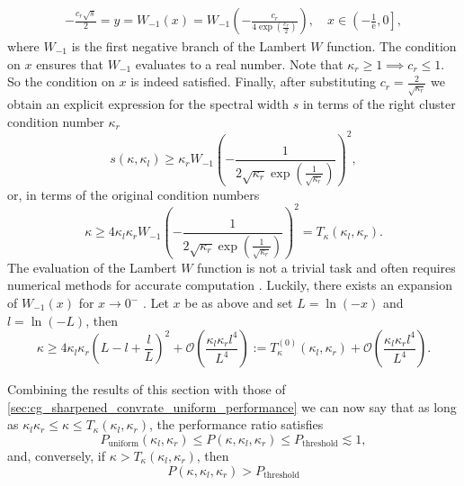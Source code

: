 \begin{align*}
    -\frac{c_r\sqrt{s}}{2} = y = W_{-1}(x) = W_{-1}\left(-\frac{c_r}{4\exp\left(\frac{c_r}{2}\right)}\right), \quad x \in \left(-\frac{1}{\mathrm{e}}, 0 \right],
\end{align*}
where $W_{-1}$ is the first negative branch of the Lambert $W$ function. The condition on $x$ ensures that $W_{-1}$ evaluates to a real number. Note that $\kappa_r\geq1 \implies c_r \leq 1$. So the condition on $x$ is indeed satisfied. Finally, after substituting $c_r = \frac{2}{\sqrt{\kappa_r}}$ we obtain an explicit expression for the spectral width $s$ in terms of the right cluster condition number $\kappa_r$
\[
    s(\kappa, \kappa_l) \geq \kappa_r W_{-1}\left(-\frac{1}{2\sqrt{\kappa_r}\exp\left(\frac{1}{\sqrt{\kappa_r}}\right)}\right)^2,
\]
or, in terms of the original condition numbers
\begin{equation}
    \kappa \geq 4\kappa_l\kappa_r W_{-1}\left(-\frac{1}{2\sqrt{\kappa_r}\exp\left(\frac{1}{\sqrt{\kappa_r}}\right)}\right)^2 = T_{\kappa}(\kappa_l, \kappa_r).
    \label{eq:threshold_inequality_explicit}
\end{equation}
The evaluation of the Lambert $W$ function is not a trivial task and often requires numerical methods for accurate computation \cite{evaluation_of_the_lambert_w_function_Corless1996}. Luckily, there exists an expansion of $W_{-1}(x)$ for $x\rightarrow0^-$ \cite[Equation 4.19]{evaluation_of_the_lambert_w_function_Corless1996}. Let $x$ be as above and set $L = \ln(-x)$ and $l = \ln(-L)$, then
\begin{equation}
    \kappa \geq 4\kappa_l\kappa_r \left(L - l + \frac{l}{L}\right)^2 + \mathcal{O}\left(\frac{\kappa_l\kappa_rl^4}{L^4}\right) := T^{(0)}_{\kappa}(\kappa_l, \kappa_r) + \mathcal{O}\left(\frac{\kappa_l\kappa_rl^4}{L^4}\right).
    \label{eq:threshold_inequality_explicit_expansion}
\end{equation}

Combining the results of this section with those of \cref{sec:cg_sharpened_convrate_uniform_performance} we can now say that as long as $\kappa_l\kappa_r \leq \kappa \leq T_{\kappa}(\kappa_l, \kappa_r)$, the performance ratio satisfies
\begin{equation}
    P_{\text{uniform}}(\kappa_l, \kappa_r) \leq P(\kappa, \kappa_l, \kappa_r) \leq P_{\text{threshold}} \lesssim 1,
    \label{eq:performance_bounds}
\end{equation}
and, conversely, if $\kappa > T_{\kappa}(\kappa_l, \kappa_r)$, then
\[
    P(\kappa, \kappa_l, \kappa_r) > P_{\text{threshold}}
\]

